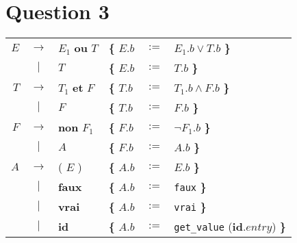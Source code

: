 \documentclass[class=article]{standalone}
\begin{document}
\section*{Question 3}

\begin{center}
  \begin{tabular}{rcllcl}
      $E$ & $\rightarrow$ & $E_1$ {\bf ou} $T$ & {\bf\{} $E.b$ & $:=$ & $E_1.b \vee T.b$ {\bf\}}\\
          & $|$           & $T$                & {\bf\{} $E.b$ & $:=$ & $T.b$ {\bf\}}\\

      $T$ & $\rightarrow$ & $T_1$ {\bf et} $F$ & {\bf\{} $T.b$ & $:=$ & $T_1.b \wedge F.b$ {\bf\}}\\
          & $|$           & $F$                & {\bf\{} $T.b$ & $:=$ & $F.b$ {\bf\}}\\

      $F$ & $\rightarrow$ & {\bf non} $F_1$    & {\bf\{} $F.b$ & $:=$ & $\neg F_1.b$ {\bf\}}\\
          & $|$           & $A$                & {\bf\{} $F.b$ & $:=$ & $A.b$ {\bf\}}\\

      $A$ & $\rightarrow$ & ( $E$ )            & {\bf\{} $A.b$ & $:=$ & $E.b$ {\bf\}}\\
          & $|$           & {\bf faux}         & {\bf\{} $A.b$ & $:=$ & \lstinline[]$faux$  {\bf\}}\\
          & $|$           & {\bf vrai}         & {\bf\{} $A.b$ & $:=$ & \lstinline[]$vrai$  {\bf\}}\\
          & $|$           & {\bf id}           & {\bf\{} $A.b$ & $:=$ & \lstinline[]$get_value$ ({\bf id}$.entry$) {\bf\}}\\
  \end{tabular}
\end{center}
\end{document}
